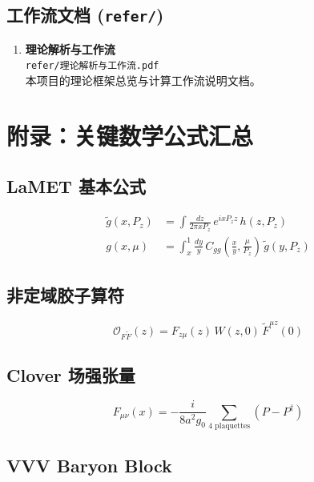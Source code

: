 \documentclass[12pt,a4paper]{ctexart}
\begin{document}
\subsection{工作流文档 (\texttt{refer/})}

\begin{enumerate}
    \item \textbf{理论解析与工作流} \\
    \texttt{refer/理论解析与工作流.pdf} \\
    本项目的理论框架总览与计算工作流说明文档。
\end{enumerate}

\section{附录：关键数学公式汇总}
\label{sec:appendix}

\subsection{LaMET 基本公式}

\begin{align}
    \tilde{g}(x, P_z) &= \int \frac{dz}{2\pi x P_z} \, e^{i x P_z z} \, h(z, P_z) \\
    g(x, \mu) &= \int_x^1 \frac{dy}{y} \, C_{gg}\left(\frac{x}{y}, \frac{\mu}{P_z}\right) \, \tilde{g}(y, P_z)
\end{align}

\subsection{非定域胶子算符}

\begin{equation}
\mathcal{O}_{F\tilde{F}}(z) = F_{z\mu}(z) \, W(z, 0) \, \tilde{F}^{\mu z}(0)
\end{equation}

\subsection{Clover 场强张量}

\begin{equation}
F_{\mu\nu}(x) = -\frac{i}{8a^2 g_0} \sum_{\text{4 plaquettes}} \left(P - P^\dagger\right)
\end{equation}

\subsection{VVV Baryon Block}
\end{document}
